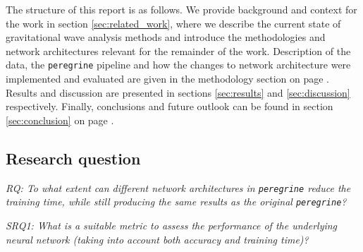 The structure of this report is as follows. We provide background and context for the work in section \ref{sec:related_work}, where we describe the current state of gravitational wave analysis methods and introduce the methodologies and network architectures relevant for the remainder of the work. Description of the data, the \texttt{peregrine} pipeline and how the changes to network architecture were implemented and evaluated are given in the methodology section on page \pageref{sec:methodology}. Results and discussion are presented in sections \ref{sec:results} and \ref{sec:discussion} respectively. Finally, conclusions and future outlook can be found in section \ref{sec:conclusion} on page \pageref{sec:conclusion}.

\subsection*{Research question}

\noindent \textit{RQ: To what extent can different network architectures in \texttt{peregrine} reduce the training time, while still producing the same results as the original \texttt{peregrine}?}

\noindent \textit{SRQ1: What is a suitable metric to assess the performance of the underlying neural network (taking into account both accuracy and training time)?}
